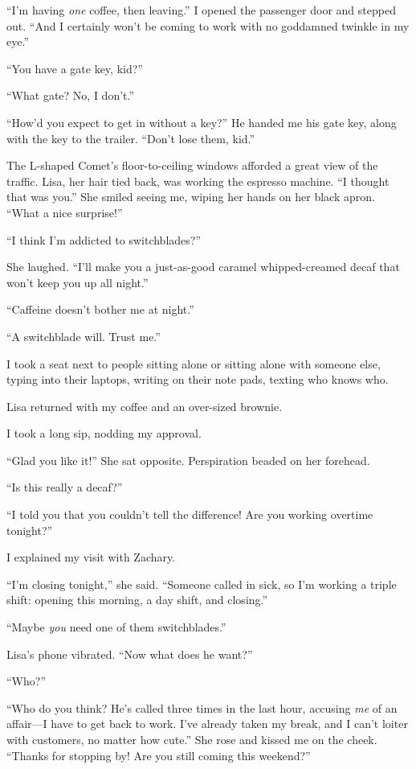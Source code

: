 ``I'm having \emph{one} coffee, then leaving.'' I opened the passenger
door and stepped out. ``And I certainly won't be coming to work with no
goddamned twinkle in my eye.''

``You have a gate key, kid?''

``What gate? No, I don't.''

``How'd you expect to get in without a key?'' He handed me his gate key,
along with the key to the trailer. ``Don't lose them, kid.''

The L-shaped Comet's floor-to-ceiling windows afforded a great view of
the traffic. Lisa, her hair tied back, was working the espresso machine.
``I thought that was you.'' She smiled seeing me, wiping her hands on
her black apron. ``What a nice surprise!''

``I think I'm addicted to switchblades?''

She laughed. ``I'll make you a just-as-good caramel whipped\--\-creamed
decaf that won't keep you up all night.''

``Caffeine doesn't bother me at night.''

``A switchblade will. Trust me.''

I took a seat next to people sitting alone or sitting alone with someone
else, typing into their laptops, writing on their note pads, texting who
knows who.

Lisa returned with my coffee and an over-sized brownie.

I took a long sip, nodding my approval.

``Glad you like it!'' She sat opposite. Perspiration beaded on her
forehead.

``Is this really a decaf?''

``I told you that you couldn't tell the difference! Are you working
overtime tonight?''

I explained my visit with Zachary.

``I'm closing tonight,'' she said. ``Someone called in sick, so I'm
working a triple shift: opening this morning, a day shift, and
closing.''

``Maybe \emph{you} need one of them switchblades.''

Lisa's phone vibrated. ``Now what does he want?''

``Who?''

``Who do you think? He's called three times in the last hour, accusing
\emph{me} of an affair---I have to get back to work. I've already taken
my break, and I can't loiter with customers, no matter how cute.'' She
rose and kissed me on the cheek. ``Thanks for stopping by! Are you still
coming this weekend?''

